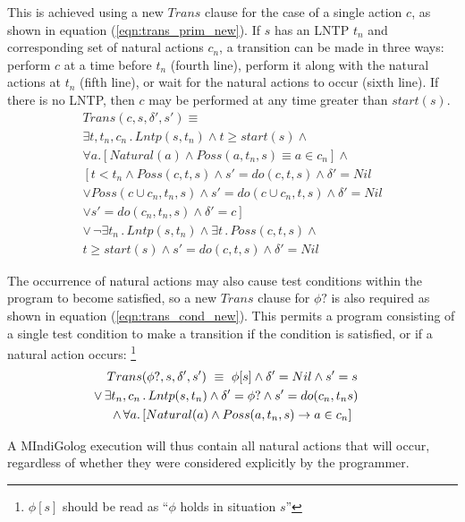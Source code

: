 This is achieved using a new $Trans$ clause for the case of a single
action $c$, as shown in equation (\ref{eqn:trans_prim_new}). If
$s$ has an LNTP $t_{n}$ and corresponding set of natural actions
$c_{n}$, a transition can be made in three ways: perform $c$ at
a time before $t_{n}$ (fourth line), perform it along with the natural
actions at $t_{n}$ (fifth line), or wait for the natural actions
to occur (sixth line). If there is no LNTP, then $c$ may be performed
at any time greater than $start(s)$.\begin{multline}
Trans(c,s,\delta',s')\equiv\\
\exists t,t_{n},c_{n}\,.\, Lntp(s,t_{n})\wedge t\geq start(s)\wedge\\
\forall a.\left[Natural(a)\wedge Poss(a,t_{n},s)\equiv a\in c_{n}\right]\wedge\\
\left[t<t_{n}\wedge Poss(c,t,s)\wedge s'=do(c,t,s)\wedge\delta'=Nil\right.\\
\vee Poss(c\cup c_{n},t_{n},s)\wedge s'=do(c\cup c_{n},t,s)\wedge\delta'=Nil\\
\vee\left.s'=do(c_{n},t_{n},s)\wedge\delta'=c\right]\\
\vee\,\neg\exists t_{n}\,.\, Lntp(s,t_{n})\wedge\exists t\,.\, Poss(c,t,s)\wedge\\
t\geq start(s)\wedge s'=do(c,t,s)\wedge\delta'=Nil\label{eqn:trans_prim_new}\end{multline}


The occurrence of natural actions may also cause test conditions within
the program to become satisfied, so a new $Trans$ clause for $\phi?$
is also required as shown in equation (\ref{eqn:trans_cond_new}).
This permits a program consisting of a single test condition to make
a transition if the condition is satisfied, or if a natural action
occurs:%
\footnote{$\phi[s]$ should be read as {}``$\phi$ holds in situation $s$''%
} \begin{multline}
Trans(\phi?,s,\delta',s')\,\,\equiv\,\,\phi[s]\wedge\delta'=Nil\wedge s'=s\\
\shoveright{\vee\,\exists t_{n},c_{n}\,.\, Lntp(s,t_{n})\wedge\delta'=\phi?\wedge s'=do(c_{n},t_{n}s)}\\
\wedge\,\forall a.\left[Natural(a)\wedge Poss(a,t_{n},s)\rightarrow a\in c_{n}\right]\label{eqn:trans_cond_new}\end{multline}


A MIndiGolog execution will thus contain all natural actions that
will occur, regardless of whether they were considered explicitly
by the programmer.

